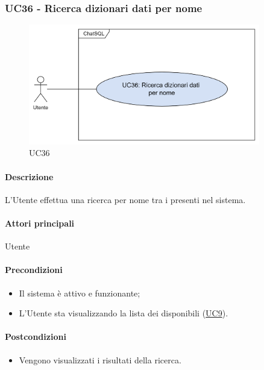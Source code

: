 \subsubsection{UC36 - Ricerca dizionari dati per nome}\label{UC36}

\begin{figure}[H]
  \centering
  \includegraphics[width=0.90\textwidth]{assets/uc36.png}
  \caption{UC36}
\end{figure}

\paragraph*{Descrizione}
L'Utente effettua una ricerca per nome tra i  presenti nel sistema.

\paragraph*{Attori principali}
Utente

\paragraph*{Precondizioni}
\begin{itemize}
  \item Il sistema è attivo e funzionante;
  \item L'Utente sta visualizzando la lista dei  disponibili (\hyperref[UC9]{UC9}).
\end{itemize}

\paragraph*{Postcondizioni}
\begin{itemize}
  \item Vengono visualizzati i risultati della ricerca.
\end{itemize}

